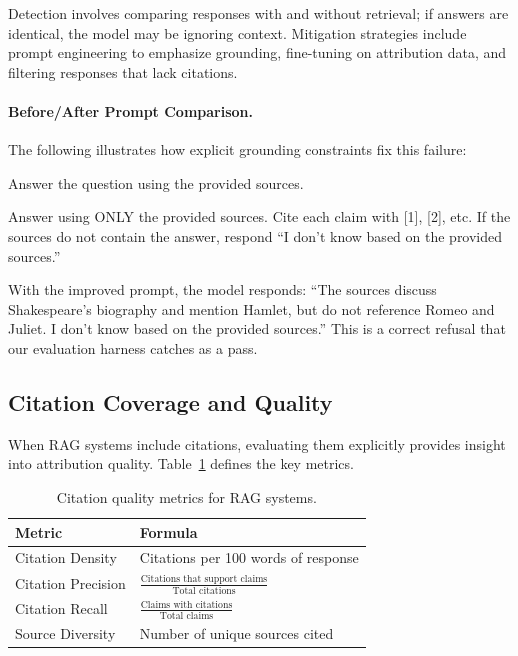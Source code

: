 Detection involves comparing responses with and without retrieval; if answers are identical, the model may be ignoring context. Mitigation strategies include prompt engineering to emphasize grounding, fine-tuning on attribution data, and filtering responses that lack citations.

\paragraph{Before/After Prompt Comparison.} The following illustrates how explicit grounding constraints fix this failure:

\begin{badexample}
\small Answer the question using the provided sources.
\end{badexample}

\begin{goodexample}
\small Answer using ONLY the provided sources. Cite each claim with [1], [2], etc. If the sources do not contain the answer, respond ``I don't know based on the provided sources.''
\end{goodexample}

With the improved prompt, the model responds: ``The sources discuss Shakespeare's biography and mention Hamlet, but do not reference Romeo and Juliet. I don't know based on the provided sources.'' This is a correct refusal that our evaluation harness catches as a pass.

\subsection{Citation Coverage and Quality}

When RAG systems include citations, evaluating them explicitly provides insight into attribution quality. Table~\ref{tab:citation-quality} defines the key metrics.

\begin{table}[h]
\centering
\caption{Citation quality metrics for RAG systems.}
\label{tab:citation-quality}
\begin{tabular}{@{}ll@{}}
\toprule
\textbf{Metric} & \textbf{Formula} \\
\midrule
Citation Density & Citations per 100 words of response \\
Citation Precision & $\frac{\text{Citations that support claims}}{\text{Total citations}}$ \\
Citation Recall & $\frac{\text{Claims with citations}}{\text{Total claims}}$ \\
Source Diversity & Number of unique sources cited \\
\bottomrule
\end{tabular}
\end{table}

